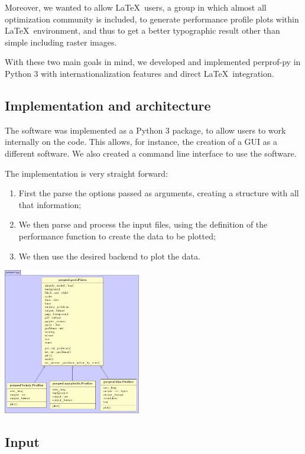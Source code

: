    Moreover,  we wanted to allow \LaTeX\ users, a group in which almost all
    optimization community is included,  to   generate performance profile plots
    within \LaTeX\ environment, and thus to get a better typographic result other
    than simple including raster  images.

    With these two main goals in mind, we developed and implemented perprof-py
    in Python 3 with internationalization features and direct \LaTeX\ integration.

\subsection*{Implementation and architecture}

    The software was implemented as a Python 3 package, to allow users to work
    internally on the code. This allows, for instance, the creation of a GUI
    as a different software. We also created a command line interface to use the
    software.

    The implementation is very straight forward:
    \begin{enumerate}
      \item First the parse the options passed as arguments, creating a
        structure with all that information;
      \item We then parse and process the input files, using the definition
        of the performance function to create the data to be plotted;
      \item We then use the desired backend to plot the data.
    \end{enumerate}

    \begin{center}
      \includegraphics[width=0.45\textwidth]{uml/uml.pdf}
    \end{center}

\subsection*{Input}

